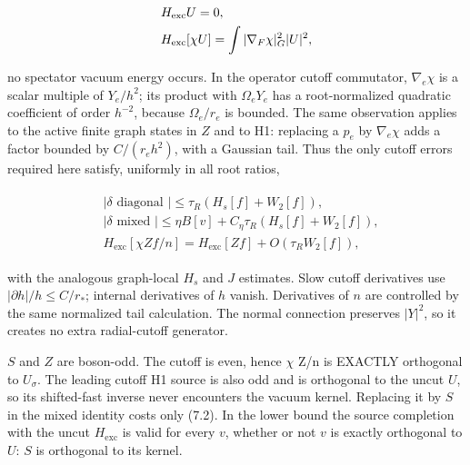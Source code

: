 \begin{gather*}
\begin{aligned}
& H_{\mathrm{exc}} U=0, \\
& H_{\mathrm{exc}}[\chi  U]=\int  \vert \nabla _{F} \chi \vert _{G}^{2} \vert U\vert ^{2},
\end{aligned}\notag
\end{gather*}

no spectator vacuum energy occurs. In the operator cutoff commutator,
\(\nabla _{e} \chi\) is a scalar multiple of \(Y_{e}/h^{2}\); its
product with \(\Omega _{e}Y_{e}\) has a root-normalized quadratic
coefficient of order \(h^{-2}\), because \(\Omega _{e}/r_{e}\) is
bounded. The same observation applies to the active finite graph states
in \(Z\) and to H1: replacing a \(p_{e}\) by \(\nabla _{e} \chi\) adds a
factor bounded by \(C/(r_{e} h^{2})\), with a Gaussian tail. Thus the
only cutoff errors required here satisfy, uniformly in all root ratios,

\begin{gather*}
\begin{aligned}
& \vert \delta  \text{ diagonal }\vert \le \tau _{R}(H_{s}[f]+W_{2}[f]), \\
& \vert \delta  \text{ mixed }\vert \le \eta  B[v]+C_{\eta} \tau _{R}(H_{s}[f]+W_{2}[f]), \\
& H_{\mathrm{exc}}[\chi  Zf/n]=H_{\mathrm{exc}}[Zf]+O(\tau _{R} W_{2}[f]),
\end{aligned}\tag{7.2}
\end{gather*}

with the analogous graph-local \(H_{s}\) and \(J\) estimates. Slow
cutoff derivatives use \(\vert \partial  h\vert /h\le C/r_{*}\);
internal derivatives of \(h\) vanish. Derivatives of \(n\) are
controlled by the same normalized tail calculation. The normal
connection preserves \(\vert Y\vert ^{2}\), so it creates no extra
radial-cutoff generator.

\(S\) and \(Z\) are boson-odd. The cutoff is even, hence \(\chi\) Z/n is
EXACTLY orthogonal to \(U_{\sigma}\). The leading cutoff H1 source is
also odd and is orthogonal to the uncut \(U\), so its shifted-fast
inverse never encounters the vacuum kernel. Replacing it by \(S\) in the
mixed identity costs only (7.2). In the lower bound the source
completion with the uncut \(H_{\mathrm{exc}}\) is valid for every \(v\),
whether or not \(v\) is exactly orthogonal to \(U\): \(S\) is orthogonal
to its kernel.

